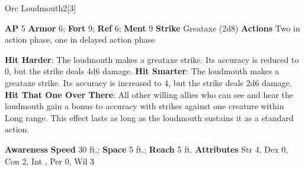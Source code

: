 \begin{monsection}{Orc Loudmouth}{2}[3]
\vspace{-1em}\vspace{-1em}
\begin{spellcontent}
\begin{spelltargetinginfo}
{\textbf{AP} 5}
\pari \textbf{Armor} 6;
\textbf{Fort} 9;
\textbf{Ref} 6;
\textbf{Ment} 9
\pari \textbf{Strike} Greataxe  (2d8)
\pari \textbf{Actions} Two in action phase, one in delayed action phase
\end{spelltargetinginfo}
\begin{spelleffects}
\pari
\textbf{Hit Harder}:
The loudmouth makes a greataxe strike.
Its accuracy is reduced to 0, but the strike deals 4d6 damage.
\vspace{0.5em}
\pari
\textbf{Hit Smarter}:
The loudmouth makes a greataxe strike.
Its accuracy is increased to 4, but the strike deals 2d6 damage.
\vspace{0.5em}
\pari
\textbf{Hit That One Over There}:
All other willing allies who can see and hear the loudmouth gain a  bonus to accuracy with strikes against one creature within Long range.
This effect lasts as long as the loudmouth sustains it as a standard action.
\end{spelleffects}
\end{spellcontent}
\begin{spellsubcontent}
\begin{spellfooter}
\pari \textbf{Awareness} 
\pari \textbf{Speed} 30 ft.;
\textbf{Space} 5 ft.;
\textbf{Reach} 5 ft.
\pari \textbf{Attributes}
Str 4,
Dex 0,
Con 2,
Int ,
Per 0,
Wil 3
\end{spellfooter}
\end{spellsubcontent}
\end{monsection}
